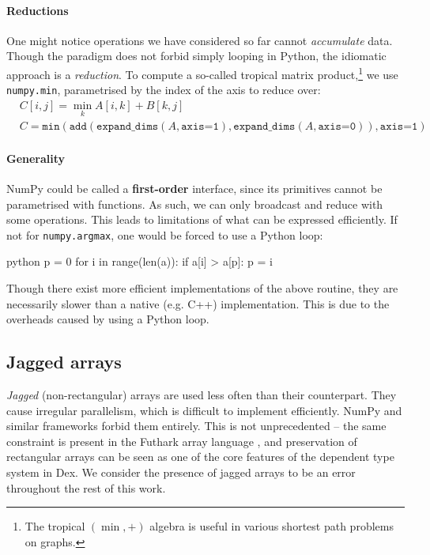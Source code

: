 \paragraph{Reductions}
One might notice operations we have considered so far cannot \textit{accumulate} data. Though the paradigm does not forbid simply looping in Python, the idiomatic approach is a \textit{reduction}. To compute a so-called tropical matrix product,\footnote{The tropical $(\min, +)$ algebra is useful in various shortest path problems on graphs.} we use \texttt{numpy.min}, parametrised by the index of the axis to reduce over:
\begin{align*}
&C[i, j] = \min_k A[i, k] + B[k, j] \\
&C = \texttt{min} \left( \texttt{add} \left(\texttt{expand\_dims}(A, \texttt{axis=1}), \texttt{expand\_dims}(A, \texttt{axis=0}) \right), \texttt{axis=1} \right)
\end{align*}

\paragraph{Generality} NumPy could be called a \textbf{first-order} interface, since its primitives cannot be parametrised with functions. As such, we can only broadcast and reduce with some operations. This leads to limitations of what can be expressed efficiently. If not for \texttt{numpy.argmax}, one would be forced to use a Python loop:
\begin{center}
\begin{cminted}{python}
p = 0
for i in range(len(a)): 
    if a[i] > a[p]: p = i
\end{cminted}
\end{center}
Though there exist more efficient implementations of the above routine, they are necessarily slower than a native (e.g. C++) implementation. This is due to the overheads caused by using a Python loop.

\subsection{Jagged arrays}

\textit{Jagged} (non-rectangular) arrays are used less often than their counterpart. They cause irregular parallelism, which is difficult to implement efficiently. NumPy and similar frameworks forbid them entirely. This is not unprecedented -- the same constraint is present in the Futhark array language \cite{henriksen2017futhark}, and preservation of rectangular arrays can be seen as one of the core features of the dependent type system in Dex. We consider the presence of jagged arrays to be an error throughout the rest of this work.

